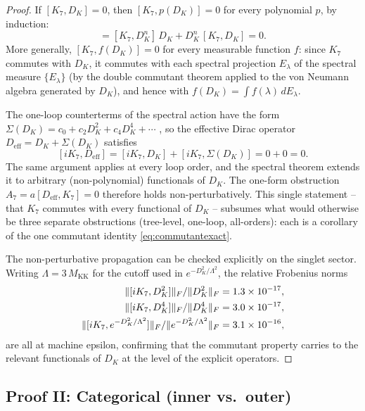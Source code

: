 \documentclass[12pt]{article}
\theoremstyle{definition}
\theoremstyle{remark}
\newcommand{\KK}{M_{\mathrm{KK}}}
\begin{document}
\begin{proof}
If $[K_7, D_K] = 0$, then $[K_7, p(D_K)] = 0$ for every polynomial $p$, by induction:
\begin{equation*}
[K_7, D_K^{n+1}] = [K_7, D_K^n]\, D_K + D_K^n\, [K_7, D_K] = 0.
\end{equation*}
More generally, $[K_7, f(D_K)] = 0$ for every measurable function $f$: since $K_7$ commutes with $D_K$, it commutes with each spectral projection $E_\lambda$ of the spectral measure $\{E_\lambda\}$ (by the double commutant theorem applied to the von Neumann algebra generated by $D_K$), and hence with $f(D_K) = \int f(\lambda)\, dE_\lambda$.

The one-loop counterterms of the spectral action have the form $\Sigma(D_K) = c_0 + c_2 D_K^2 + c_4 D_K^4 + \cdots$ \cite{vanNulandvanSuijlekom2022}, so the effective Dirac operator $D_{\mathrm{eff}} = D_K + \Sigma(D_K)$ satisfies
\begin{equation}\label{eq:oneloopcommutant}
  [iK_7, D_{\mathrm{eff}}] = [iK_7, D_K] + [iK_7, \Sigma(D_K)] = 0 + 0 = 0.
\end{equation}
The same argument applies at every loop order, and the spectral theorem extends it to arbitrary (non-polynomial) functionals of $D_K$.  The one-form obstruction $A_7 = a[D_{\mathrm{eff}}, K_7] = 0$ therefore holds non-perturbatively.  This single statement -- that $K_7$ commutes with every functional of $D_K$ -- subsumes what would otherwise be three separate obstructions (tree-level, one-loop, all-orders): each is a corollary of the one commutant identity \eqref{eq:commutantexact}.

The non-perturbative propagation can be checked explicitly on the singlet sector.  Writing $\Lambda = 3\, \KK$ for the cutoff used in $e^{-D_K^2/\Lambda^2}$, the relative Frobenius norms
\begin{align}
  \|[iK_7, D_K^2]\|_F / \|D_K^2\|_F &= 1.3 \times 10^{-17}, \notag \\
  \|[iK_7, D_K^4]\|_F / \|D_K^4\|_F &= 3.0 \times 10^{-17}, \label{eq:numverify} \\
  \|[iK_7, e^{-D_K^2/\Lambda^2}]\|_F / \|e^{-D_K^2/\Lambda^2}\|_F &= 3.1 \times 10^{-16}, \notag
\end{align}
are all at machine epsilon, confirming that the commutant property carries to the relevant functionals of $D_K$ at the level of the explicit operators.
\end{proof}

\subsection{Proof II: Categorical (inner vs.\ outer)}
\label{subsec:proof2}
\end{document}
